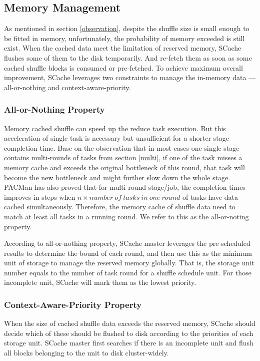 \subsection{Memory Management}
As mentioned in section \ref{observation}, despite the shuffle size is small enough to be fitted in memory, unfortunately, the probability of memory exceeded is still exist. 
When the cached data meet the limitation of reserved memory, SCache flushes some of them to the disk temporarily. 
And re-fetch them as soon as some cached shuffle blocks is consumed or pre-fetched. To achieve maximum overall improvement, SCache leverages two constraints to manage the in-memory data --- all-or-nothing and context-aware-priority.

\subsubsection{All-or-Nothing Property}
Memory cached shuffle can speed up the reduce task execution. But this acceleration of single task is necessary but unsufficient for a shorter stage completion time. Base on the observation that in most cases one single stage contains multi-rounds of tasks from section \ref{multi}, if one of the task misses a memory cache and exceeds the original bottleneck of this round, that task will become the new bottleneck and might further slow down the whole stage. PACMan\cite{pacman} has also proved that for multi-round stage/job, the completion times improves in steps when $n\times number\ of\ tasks\ in\ one\ round$ of tasks have data cached simultaneously. Therefore, the memory cache of shuffle data need to match at least all tasks in a running round. We refer to this as the all-or-noting property. 

According to all-or-nothing property, SCache master leverages the pre-scheduled results to determine the bound of each round, and then use this as the minimum unit of storage to manage the reserved memory globally.
That is, the storage unit number equals to the number of task round for a shuffle schedule unit.
For those incomplete unit, SCache will mark them as the lowest priority.

\subsubsection{Context-Aware-Priority Property}
When the size of cached shuffle data exceeds the reserved memory, SCache should decide which of these should be flushed to disk according to the priorities of each storage unit. SCache master first searches if there is an incomplete unit and flush all blocks belonging to the unit to disk cluster-widely. 


